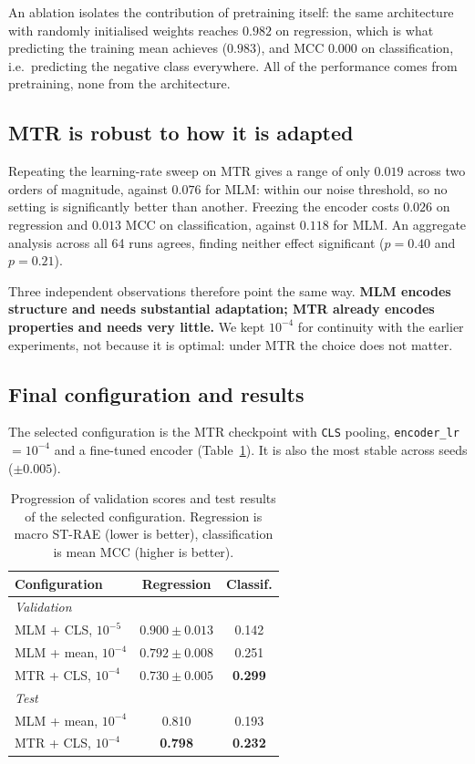 \documentclass[10pt,twocolumn,a4paper]{article}
\begin{document}
An ablation isolates the contribution of pretraining itself: the same
architecture with randomly initialised weights reaches $0.982$ on
regression, which is what predicting the training mean achieves
($0.983$), and MCC $0.000$ on classification, i.e.\ predicting the
negative class everywhere. All of the performance comes from
pretraining, none from the architecture.

\subsection{MTR is robust to how it is adapted}

Repeating the learning-rate sweep on MTR gives a range of only $0.019$
across two orders of magnitude, against $0.076$ for MLM: within our
noise threshold, so no setting is significantly better than another.
Freezing the encoder costs $0.026$ on regression and $0.013$ MCC on
classification, against $0.118$ for MLM. An aggregate analysis across
all 64 runs agrees, finding neither effect significant
($p = 0.40$ and $p = 0.21$).

Three independent observations therefore point the same way.
\textbf{MLM encodes structure and needs substantial adaptation; MTR
already encodes properties and needs very little.} We kept
$10^{-4}$ for continuity with the earlier experiments, not because it
is optimal: under MTR the choice does not matter.

\subsection{Final configuration and results}

The selected configuration is the MTR checkpoint with \texttt{CLS}
pooling, \texttt{encoder\_lr}~$=10^{-4}$ and a fine-tuned encoder
(Table~\ref{tab:final}). It is also the most stable across seeds
($\pm 0.005$).

\begin{table}[t]
  \centering
  \caption{Progression of validation scores and test results of the
  selected configuration. Regression is macro ST-RAE (lower is better),
  classification is mean MCC (higher is better).}
  \label{tab:final}
  \begin{tabular}{lcc}
    \toprule
    Configuration & Regression & Classif. \\
    \midrule
    \multicolumn{3}{l}{\emph{Validation}} \\
    MLM + CLS, $10^{-5}$  & $0.900 \pm 0.013$ & 0.142 \\
    MLM + mean, $10^{-4}$ & $0.792 \pm 0.008$ & 0.251 \\
    MTR + CLS, $10^{-4}$  & $\mathbf{0.730 \pm 0.005}$ & \textbf{0.299} \\
    \midrule
    \multicolumn{3}{l}{\emph{Test}} \\
    MLM + mean, $10^{-4}$ & 0.810 & 0.193 \\
    MTR + CLS, $10^{-4}$  & \textbf{0.798} & \textbf{0.232} \\
    \bottomrule
  \end{tabular}
\end{table}
\end{document}
